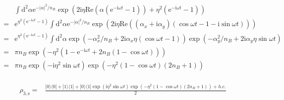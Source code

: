 \documentclass[10pt,fleqn]{article}
\newcommand{\ud}{\mathrm{d}}
\newcommand{\ue}{\mathrm{e}}
\newcommand{\ui}{\mathrm{i}}
\newcommand{\eqar}[1]
{
  \begin{align}
    #1
  \end{align}
}
\newcommand{\paren}[1]{{\left({#1}\right)}}
\newcommand{\abs}[1]{{\left|{#1}\right|}}
\begin{document}
\eqar{
  \begin{split}
    &\int\ud^2\alpha \ue^{-\abs{\alpha}^2/n_B}\exp\paren{
      2\ui\eta\mathrm{Re}\paren{\alpha\paren{\ue^{-\ui\omega t}-1}}
      +\eta^2\paren{\ue^{-\ui\omega t}-1}
      }\\
    =&\ue^{\eta^2\paren{\ue^{-\ui\omega t}-1}}
       \int\ud^2\alpha \ue^{-\abs{\alpha}^2/n_B}\exp\paren{
       2\ui\eta\mathrm{Re}\paren{\paren{\alpha_x+\ui\alpha_y}\paren{\cos\omega t-1-\ui\sin\omega t}}}\\
    =&\ue^{\eta^2\paren{\ue^{-\ui\omega t}-1}}
       \int\ud^2\alpha
       \exp\paren{
       -\alpha_x^2/n_B
       +2\ui\alpha_x\eta\paren{\cos\omega t-1}
       }
       \exp\paren{
       -\alpha_y^2/n_B
       +2\ui\alpha_y\eta\sin\omega t
       }\\
    =&\pi n_B\exp\paren{-\eta^2\paren{1-\ue^{-\ui\omega t}+2n_B\paren{1-\cos\omega t}}}\\
    =&\pi n_B\exp\paren{-\ui\eta^2\sin\omega t}\exp\paren{-\eta^2\paren{1-\cos\omega t}\paren{2n_B+1}}
  \end{split}
}

\eqar{
  \begin{split}
    \rho_{3,\mathrm{s}}=&\frac{|0\rangle\langle0|+|1\rangle\langle1|+|0\rangle\langle1|\exp\paren{\ui\eta^2\sin\omega t}\exp\paren{-\eta^2\paren{1-\cos\omega t}\paren{2n_B+1}}+h.c.}{2}
  \end{split}
}
\end{document}

